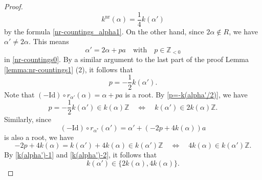 \documentclass[11pt]{amsart}
\newcommand{\Z}{\mathbb{Z}}
\newcommand{\nr}{\mathrm{nr}}
\begin{document}
{\begin{proof}
\begin{equation}\label{(5.5.6)-II}
k^{\nr}(\alpha)=\frac14 k(\alpha')
\end{equation}
by the formula \eqref{nr-countings_alpha1}. 
On the other hand, since $2\alpha\not \in R$, we have $\alpha'\ne 2\alpha$. 
This means
\[\alpha'=2\alpha+pa\quad \text{with}\quad p\in \Z_{< 0}\] 
in \eqref{nr-countings0}.
By a similar argument to the last part 
of the proof Lemma \ref{lemma:nr-countings1} (2), it follows that 
\begin{equation}\label{p=-k(alpha'/2)}
p=-\frac12 k(\alpha').
\end{equation}
Note that
$(-\mathrm{Id})\circ r_{\alpha'}(\alpha)=\alpha+pa$
is a root. By \eqref{p=-k(alpha'/2)}, we have
\begin{equation}\label{k(alpha')-1}
p=-\dfrac12 k(\alpha')\in k(\alpha)\Z\quad \Longleftrightarrow \quad 
k(\alpha')\in 2k(\alpha)\Z. 
\end{equation}
Similarly, since 
\[(-\mathrm{Id})\circ r_{\alpha^\ast}(\alpha')=\alpha'+(-2p+4k(\alpha))a\]
is also a root, we have
\begin{equation}\label{k(alpha')-2}
-2p+4k(\alpha)=k(\alpha')+4k(\alpha)\in k(\alpha')\Z\quad \Longleftrightarrow \quad 
4k(\alpha)\in k(\alpha')\Z. 
\end{equation}
By \eqref{k(alpha')-1} and \eqref{k(alpha')-2}, it %
follows that 
\[k(\alpha')\in \{2k(\alpha),4k(\alpha)\}.\]


\end{proof}}
\end{document}
